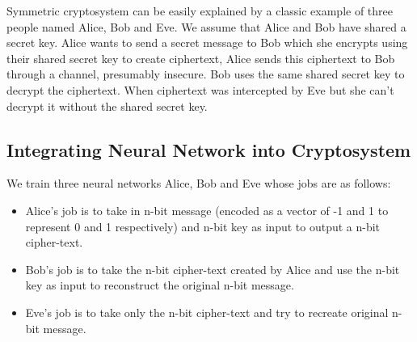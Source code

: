 Symmetric cryptosystem can be easily explained by a classic example of three people named Alice, Bob and Eve. We assume that Alice and Bob have shared a secret key. Alice wants to send a secret message to Bob which she encrypts using their shared secret key to create ciphertext, Alice sends this ciphertext to Bob through a channel, presumably insecure. Bob uses the same shared secret key to decrypt the ciphertext. When ciphertext was intercepted by Eve but she can’t decrypt it without the shared secret key.
\subsection {Integrating Neural Network into Cryptosystem}
We train three neural networks Alice, Bob and Eve whose jobs are as follows:
\begin{itemize}
   \item Alice’s job is to take in n-bit message (encoded as a vector of -1 and 1 to represent 0 and 1 respectively) and n-bit key as input to output a n-bit cipher-text.
    \item Bob’s job is to take the n-bit cipher-text created by Alice and use the n-bit key as input to reconstruct the original n-bit message.
    \item Eve’s job is to take only the n-bit cipher-text and try to recreate original n-bit message.
\end{itemize}